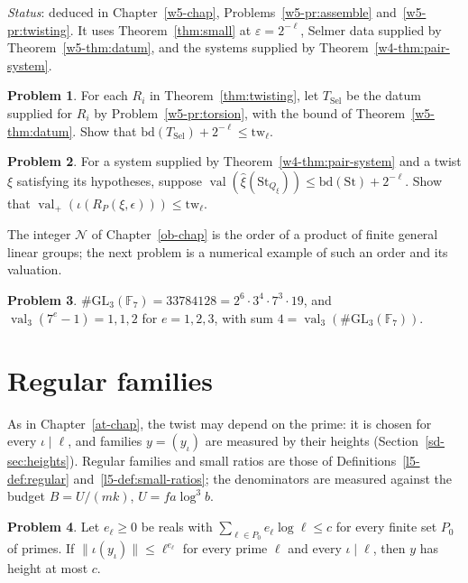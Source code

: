 \documentclass[reqno]{amsart}
\newcounter{chap}
\theoremstyle{definition}
\newtheorem{problem}{Problem}[section]
\theoremstyle{plain}
\newcommand{\val}{\operatorname{val}}
\newcommand{\St}{\mathrm{St}}
\newcommand{\bd}{\mathrm{bd}}
\newcommand{\TS}{T_{\mathrm{Sel}}}
\begin{document}
\emph{Status}: deduced in Chapter~\ref{w5-chap}, Problems~\ref{w5-pr:assemble} and~\ref{w5-pr:twisting}.  It uses Theorem~\ref{thm:small} at \(\varepsilon = 2^{-\ell}\), Selmer data supplied by Theorem~\ref{w5-thm:datum}, and the systems supplied by Theorem~\ref{w4-thm:pair-system}.

\begin{problem}\label{pr:selmer-input}
For each \(R_i\) in Theorem~\ref{thm:twisting}, let \(\TS\) be the datum supplied for \(R_i\) by Problem~\ref{w5-pr:torsion}, with the bound of Theorem~\ref{w5-thm:datum}.  Show that \(\bd(\TS) + 2^{-\ell} \le \mathrm{tw}_\ell\).
\end{problem}

\begin{problem}\label{pr:ratio-input}
For a system supplied by Theorem~\ref{w4-thm:pair-system} and a twist \(\xi\) satisfying its hypotheses, suppose \(\val(\hat\xi(\St_{Q_\xi})) \le \bd(\St) + 2^{-\ell}\).  Show that \(\val_+(\iota(R_P(\xi,\epsilon))) \le \mathrm{tw}_\ell\).
\end{problem}

The integer \(\mathcal N\) of Chapter~\ref{ob-chap} is the order of a product of finite general linear groups; the next problem is a numerical example of such an order and its valuation.

\begin{problem}\label{pr:group-order}
\(\#\mathrm{GL}_3(\mathbb F_7) = 33784128 = 2^6\cdot 3^4\cdot 7^3\cdot 19\), and \(\val_3(7^e - 1) = 1, 1, 2\) for \(e = 1, 2, 3\), with sum \(4 = \val_3(\#\mathrm{GL}_3(\mathbb F_7))\).
\end{problem}

\section{Regular families}\label{sec:regular}

As in Chapter~\ref{at-chap}, the twist may depend on the prime: it is chosen for every \(\iota \mid \ell\), and families \(y = (y_\iota)\) are measured by their heights (Section~\ref{sd-sec:heights}).  Regular families and small ratios are those of Definitions~\ref{l5-def:regular} and~\ref{l5-def:small-ratios}; the denominators are measured against the budget \(B = U/(mk)\), \(U = fa\log^3 b\).

\begin{problem}\label{pr:height}
Let \(e_\ell \ge 0\) be reals with \(\sum_{\ell \in P_0} e_\ell\log \ell \le c\) for every finite set \(P_0\) of primes.  If \(\lVert \iota(y_\iota)\rVert \le \ell^{e_\ell}\) for every prime \(\ell\) and every \(\iota \mid \ell\), then \(y\) has height at most \(c\).
\end{problem}
\end{document}
